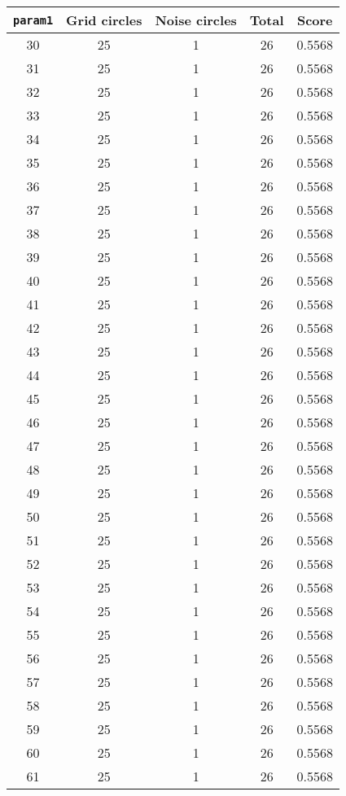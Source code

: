 \documentclass[letterpaper, 12pt]{article}
\begin{document}
\begin{longtable}{|c|c|c|c|c|}
\hline
\textbf{\texttt{param1}} & \textbf{Grid circles} & \textbf{Noise circles} & \textbf{Total} & \textbf{Score} \\
\hline
30 & 25 & 1 & 26 & 0.5568 \\
\hline
31 & 25 & 1 & 26 & 0.5568 \\
\hline
32 & 25 & 1 & 26 & 0.5568 \\
\hline
33 & 25 & 1 & 26 & 0.5568 \\
\hline
34 & 25 & 1 & 26 & 0.5568 \\
\hline
35 & 25 & 1 & 26 & 0.5568 \\
\hline
36 & 25 & 1 & 26 & 0.5568 \\
\hline
37 & 25 & 1 & 26 & 0.5568 \\
\hline
38 & 25 & 1 & 26 & 0.5568 \\
\hline
39 & 25 & 1 & 26 & 0.5568 \\
\hline
40 & 25 & 1 & 26 & 0.5568 \\
\hline
41 & 25 & 1 & 26 & 0.5568 \\
\hline
42 & 25 & 1 & 26 & 0.5568 \\
\hline
43 & 25 & 1 & 26 & 0.5568 \\
\hline
44 & 25 & 1 & 26 & 0.5568 \\
\hline
45 & 25 & 1 & 26 & 0.5568 \\
\hline
46 & 25 & 1 & 26 & 0.5568 \\
\hline
47 & 25 & 1 & 26 & 0.5568 \\
\hline
48 & 25 & 1 & 26 & 0.5568 \\
\hline
49 & 25 & 1 & 26 & 0.5568 \\
\hline
50 & 25 & 1 & 26 & 0.5568 \\
\hline
51 & 25 & 1 & 26 & 0.5568 \\
\hline
52 & 25 & 1 & 26 & 0.5568 \\
\hline
53 & 25 & 1 & 26 & 0.5568 \\
\hline
54 & 25 & 1 & 26 & 0.5568 \\
\hline
55 & 25 & 1 & 26 & 0.5568 \\
\hline
56 & 25 & 1 & 26 & 0.5568 \\
\hline
57 & 25 & 1 & 26 & 0.5568 \\
\hline
58 & 25 & 1 & 26 & 0.5568 \\
\hline
59 & 25 & 1 & 26 & 0.5568 \\
\hline
60 & 25 & 1 & 26 & 0.5568 \\
\hline
61 & 25 & 1 & 26 & 0.5568 \\

\end{longtable}
\end{document}
